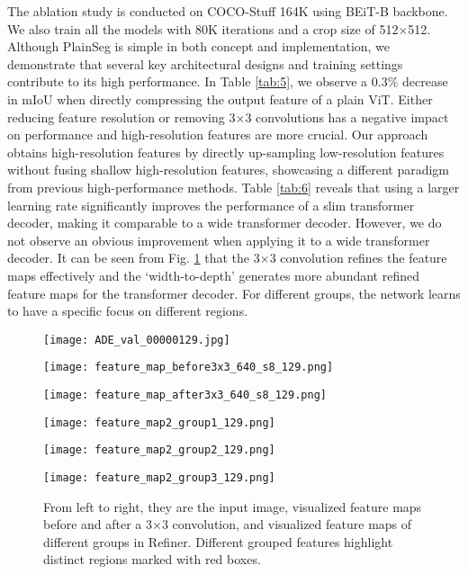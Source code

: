 \documentclass{article} \usepackage{iclr2024_conference,times}
\begin{document}
The ablation study is conducted on COCO-Stuff 164K using BEiT-B backbone. We also train all the models with 80K iterations and a crop size of 512$\times$512. Although PlainSeg is simple in both concept and implementation, we demonstrate that several key architectural designs and training settings contribute to its high performance. In Table \ref{tab:5}, we observe a 0.3$\%$ decrease in mIoU when directly compressing the output feature of a plain ViT. Either reducing feature resolution or removing 3$\times$3 convolutions has a negative impact on performance and high-resolution features are more crucial. Our approach obtains high-resolution features by directly up-sampling low-resolution features without fusing shallow high-resolution features, showcasing a different paradigm from previous high-performance methods. Table \ref{tab:6} reveals that using a larger learning rate significantly improves the performance of a slim transformer decoder, making it comparable to a wide transformer decoder. However, we do not observe an obvious improvement when applying it to a wide transformer decoder. It can be seen from Fig. \ref{fig3} that the 3$\times$3 convolution refines the feature maps effectively and the `width-to-depth' generates more abundant refined feature maps for the transformer decoder. For different groups, the network learns to have a specific focus on different regions.




\begin{figure}
\centering
\begin{minipage}{0.85in}
\texttt{[image: ADE\_val\_00000129.jpg]}
\end{minipage}
\begin{minipage}{0.85in}
\texttt{[image: feature\_map\_before3x3\_640\_s8\_129.png]}
\end{minipage}
\begin{minipage}{0.85in}
\texttt{[image: feature\_map\_after3x3\_640\_s8\_129.png]}
\end{minipage}
\begin{minipage}{0.85in}
\texttt{[image: feature\_map2\_group1\_129.png]}
\end{minipage}
\begin{minipage}{0.85in}
\texttt{[image: feature\_map2\_group2\_129.png]}
\end{minipage}
\begin{minipage}{0.85in}
\texttt{[image: feature\_map2\_group3\_129.png]}
\end{minipage}
\caption{From left to right, they are the input image, visualized feature maps before and after a 3$\times$3 convolution, and visualized feature maps of different groups in Refiner. Different grouped features highlight distinct regions marked with red boxes.}
\label{fig3}
\end{figure}
\end{document}
